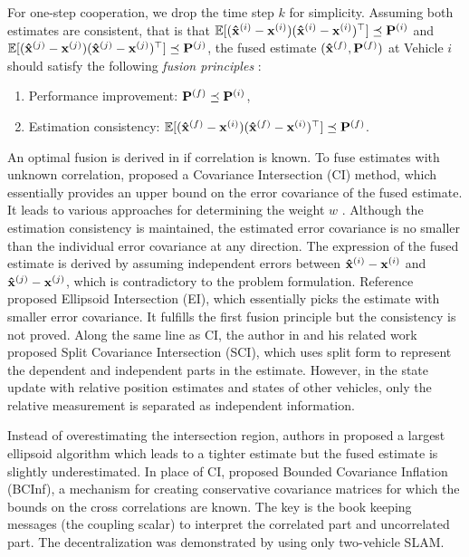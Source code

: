 For one-step cooperation, we drop the time step $k$ for simplicity. Assuming both estimates are consistent, that is that $\mathbb{E}[({\bf\hat x}^{(i)}-{\bf x}^{(i)})({\bf\hat x}^{(i)}-{\bf x}^{(i)})^\top]\preceq{\bf P}^{(i)}$ and $\mathbb{E}[({\bf\hat x}^{(j)}-{\bf x}^{(j)})({\bf\hat x}^{(j)}-{\bf x}^{(j)})^\top]\preceq{\bf P}^{(j)}$, the fused estimate $({\bf \hat x}^{(f)},{\bf P}^{(f)})$ at Vehicle $i$ should satisfy the following \textit{fusion principles} \cite{Reece2005,Uhlmann2003}:
\begin{enumerate}
    \item Performance improvement: ${\bf P}^{(f)}\preceq{\bf P}^{(i)}$,
    \item Estimation consistency: $\mathbb{E}[({\bf\hat x}^{(f)}-{\bf x}^{(i)})({\bf\hat x}^{(f)}-{\bf x}^{(i)})^\top]\preceq{\bf P}^{(f)}$.
\end{enumerate}
An optimal fusion is derived in \cite{Chang1997} if correlation is known. To fuse estimates with unknown correlation, \cite{Julier2001book} proposed a Covariance Intersection (CI) method, which essentially provides an upper bound on the error covariance of the fused estimate. It leads to various approaches for determining the weight $w$ \cite{Hanebeck2001,Chen2002}. Although the estimation consistency is maintained, the estimated error covariance is no smaller than the individual error covariance at any direction. The expression of the fused estimate is derived by assuming independent errors between ${\bf\hat x}^{(i)}-{\bf x}^{(i)}$ and ${\bf\hat x}^{(j)}-{\bf x}^{(j)}$, which is contradictory to the problem formulation. Reference \cite{Sijs2010} proposed Ellipsoid Intersection (EI), which essentially picks the estimate with smaller error covariance. It fulfills the first fusion principle but the consistency is not proved. Along the same line as CI, the author in \cite{Lihao2013A} and his related work proposed Split Covariance Intersection (SCI), which uses split form to represent the dependent and independent parts in the estimate. However, in the state update with relative position estimates and states of other vehicles, only the relative measurement is separated as independent information. 

Instead of overestimating the intersection region, authors in \cite{Benaskeur2002} proposed a largest ellipsoid algorithm which leads to a tighter estimate but the fused estimate is slightly underestimated. In place of CI, \cite{Reece2005} proposed Bounded Covariance Inflation (BCInf), a mechanism for creating conservative covariance matrices for which the bounds on the cross correlations are known. The key is the book keeping messages (the coupling scalar) to interpret the correlated part and uncorrelated part. The decentralization was demonstrated by using only two-vehicle SLAM. 

